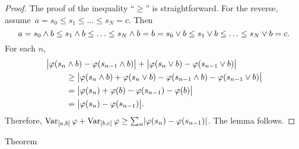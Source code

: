 \documentclass[main.tex]{subfiles}
\begin{document}
\begin{proof}
The proof of the inequality ``$\geq$'' is straightforward.
For the reverse,
assume~$a=s_0\leq s_1 \leq \ldots \leq s_N = c$.
Then
\begin{equation*}
a = s_0\wedge b \leq s_1 \wedge b \leq \ldots \leq s_N  \wedge b
  = b = s_0 \vee b \leq s_1 \vee b \leq \ldots \leq s_N\vee b = c
\text{.}
\end{equation*}
For each $n$,
\begin{align*}
 \bigl| \varphi(s_n & \wedge b) -\varphi(s_{n-1}\wedge b) \bigr|
       + \bigl| \varphi(s_n \vee b) - \varphi(s_{n-1}\vee b) \bigr|  \\
 & \geq \bigl| \varphi(s_n\wedge b)
       + \varphi(s_n \vee b) 
       -\varphi(s_{n-1}\wedge b) 
       - \varphi(s_{n-1}\vee b) \bigr| \\
 & = \bigl|\varphi(s_n) + \varphi(b) - \varphi(s_{n-1}) -\varphi(b) \bigr| \\
 & = \bigl|\varphi(s_n) - \varphi(s_{n-1})\bigr|
\text{.}
\end{align*}
Therefore,
$\mathop{\mathrm{Var}}_{[a,b]}\varphi + \mathop{\mathrm{Var}}_{[b,c]}\varphi \geq
\smash{\sum_n}|\varphi(s_n)-\varphi(s_{n-1})|$.
The lemma follows. \xqed
\end{proof}
%
%
\begin{psec}{1.10}{Theorem}
\end{psec}
\end{document}
